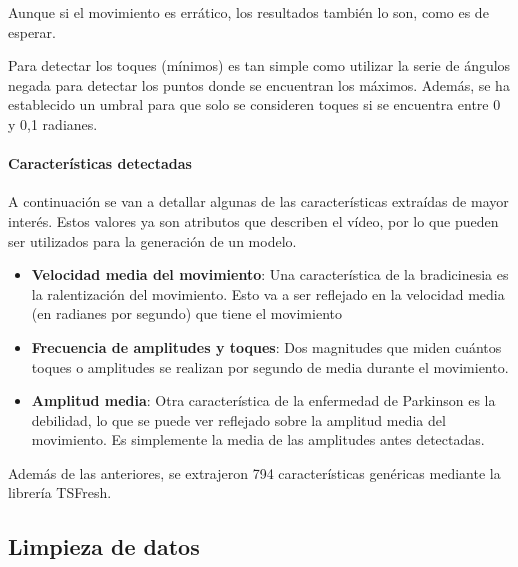 
Aunque si el movimiento es errático, los resultados también lo son, como es de
esperar.


Para detectar los toques (mínimos) es tan simple como utilizar la serie de
ángulos negada para detectar los puntos donde se encuentran los máximos. Además,
se ha establecido un umbral para que solo se consideren toques si se encuentra
entre 0 y 0,1 radianes.


\paragraph{Características detectadas}

A continuación se van a detallar algunas de las características extraídas de
mayor interés. Estos valores ya son atributos que describen el vídeo, por lo que
pueden ser utilizados para la generación de un modelo.

\begin{itemize}
    \item \textbf{Velocidad media del movimiento}: Una característica de la
    bradicinesia es la ralentización del movimiento. Esto va a ser reflejado en
    la velocidad media (en radianes por segundo) que tiene el movimiento
    \item \textbf{Frecuencia de amplitudes y toques}: Dos magnitudes que miden
    cuántos toques o amplitudes se realizan por segundo de media durante el
    movimiento.
    \item \textbf{Amplitud media}: Otra característica de la enfermedad de
    Parkinson es la debilidad, lo que se puede ver reflejado sobre la amplitud
    media del movimiento. Es simplemente la media de las amplitudes antes
    detectadas.
\end{itemize}

Además de las anteriores, se extrajeron 794 características genéricas
mediante la librería TSFresh.

\subsection{Limpieza de datos}

